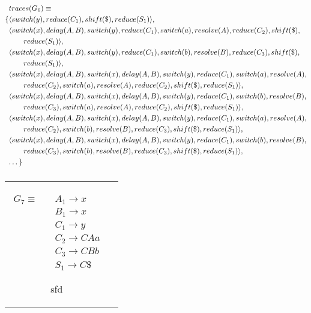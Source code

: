 \documentclass[11pt]{article}
\begin{document}
\parbox{.3\textwidth}{\begin{align*}
&traces(G_6) \equiv \\
\{ & \langle switch(y), reduce(C_1), shift(\$), reduce(S_1) \rangle,\\ 
   &  \langle switch(x), delay(A,B), switch(y), reduce(C_1), switch(a), resolve(A), reduce(C_2), shift(\$), \\&\qquad reduce(S_1) \rangle,\\
   &  \langle switch(x), delay(A,B), switch(y), reduce(C_1), switch(b), resolve(B), reduce(C_3), shift(\$), \\&\qquad reduce(S_1) \rangle,\\
   &  \langle switch(x), delay(A,B), switch(x), delay(A,B), switch(y), reduce(C_1), switch(a), resolve(A), \\&\qquad reduce(C_2), switch(a), resolve(A), reduce(C_2), shift(\$), reduce(S_1) \rangle,\\
   &  \langle switch(x), delay(A,B), switch(x), delay(A,B), switch(y), reduce(C_1), switch(b), resolve(B), \\&\qquad reduce(C_3), switch(a), resolve(A), reduce(C_2), shift(\$), reduce(S_1) \rangle,\\
   &  \langle switch(x), delay(A,B), switch(x), delay(A,B), switch(y), reduce(C_1), switch(a), resolve(A), \\&\qquad reduce(C_2), switch(b), resolve(B), reduce(C_3), shift(\$), reduce(S_1) \rangle,\\
   &  \langle switch(x), delay(A,B), switch(x), delay(A,B), switch(y), reduce(C_1), switch(b), resolve(B), \\&\qquad reduce(C_3), switch(b), resolve(B), reduce(C_3), shift(\$), reduce(S_1) \rangle,\\
   &  \textellipsis
\}
\end{align*}}

\subsubsection{}
\begin{tabular}[t]{cl}
\parbox{.3\textwidth}{
\begin{align*}
G_7 \equiv \quad & A_1 \rightarrow x\\
                 & B_1 \rightarrow x\\
                 & C_1 \rightarrow y\\
                 & C_2 \rightarrow C A a\\
                 & C_3 \rightarrow C B b\\
                 & S_1 \rightarrow C \$
\end{align*}}
\parbox{.8\textwidth}{sfd}
\end{tabular}
\end{document}
